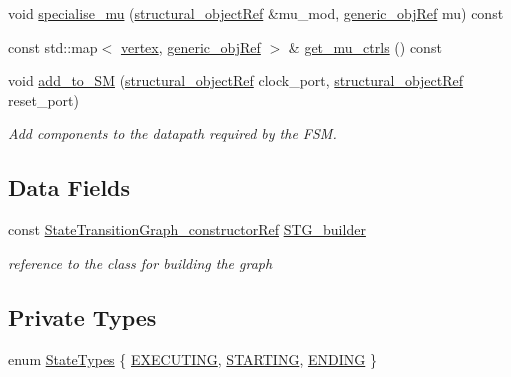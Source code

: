 \begin{DoxyCompactItemize}
void \hyperlink{classStateTransitionGraphManager_aece975a4f5bcb162267993d933d25945}{specialise\+\_\+mu} (\hyperlink{structural__objects_8hpp_a8ea5f8cc50ab8f4c31e2751074ff60b2}{structural\+\_\+object\+Ref} \&mu\+\_\+mod, \hyperlink{generic__obj_8hpp_acb533b2ef8e0fe72e09a04d20904ca81}{generic\+\_\+obj\+Ref} mu) const
\item 
const std\+::map$<$ \hyperlink{graph_8hpp_abefdcf0544e601805af44eca032cca14}{vertex}, \hyperlink{generic__obj_8hpp_acb533b2ef8e0fe72e09a04d20904ca81}{generic\+\_\+obj\+Ref} $>$ \& \hyperlink{classStateTransitionGraphManager_a36ced3a88fdbef82df4edc3bad8cc1b8}{get\+\_\+mu\+\_\+ctrls} () const
\item 
void \hyperlink{classStateTransitionGraphManager_a93645ec1387a4b918e01ee4eeec5c658}{add\+\_\+to\+\_\+\+SM} (\hyperlink{structural__objects_8hpp_a8ea5f8cc50ab8f4c31e2751074ff60b2}{structural\+\_\+object\+Ref} clock\+\_\+port, \hyperlink{structural__objects_8hpp_a8ea5f8cc50ab8f4c31e2751074ff60b2}{structural\+\_\+object\+Ref} reset\+\_\+port)
\begin{DoxyCompactList}\small\item\em Add components to the datapath required by the F\+SM. \end{DoxyCompactList}\end{DoxyCompactItemize}
\subsection*{Data Fields}
\begin{DoxyCompactItemize}
\item 
const \hyperlink{StateTransitionGraph__constructor_8hpp_a81ec81bc89e64a6183a9e272293e8373}{State\+Transition\+Graph\+\_\+constructor\+Ref} \hyperlink{classStateTransitionGraphManager_a7abab219af3706cd4fb87ecbd59d4c31}{S\+T\+G\+\_\+builder}
\begin{DoxyCompactList}\small\item\em reference to the class for building the graph \end{DoxyCompactList}\end{DoxyCompactItemize}
\subsection*{Private Types}
\begin{DoxyCompactItemize}
\item 
enum \hyperlink{classStateTransitionGraphManager_a97cb88662c4d757e2b09cadd3ccad814}{State\+Types} \{ \hyperlink{classStateTransitionGraphManager_a97cb88662c4d757e2b09cadd3ccad814a2905d50155fe31af03e4670fcad58bfd}{E\+X\+E\+C\+U\+T\+I\+NG}, 
\hyperlink{classStateTransitionGraphManager_a97cb88662c4d757e2b09cadd3ccad814aca8489355ac449b1567f1f037f317711}{S\+T\+A\+R\+T\+I\+NG}, 
\hyperlink{classStateTransitionGraphManager_a97cb88662c4d757e2b09cadd3ccad814acf38a57c0a8380960582fc07c1fbe838}{E\+N\+D\+I\+NG}
 \}
\end{DoxyCompactItemize}
